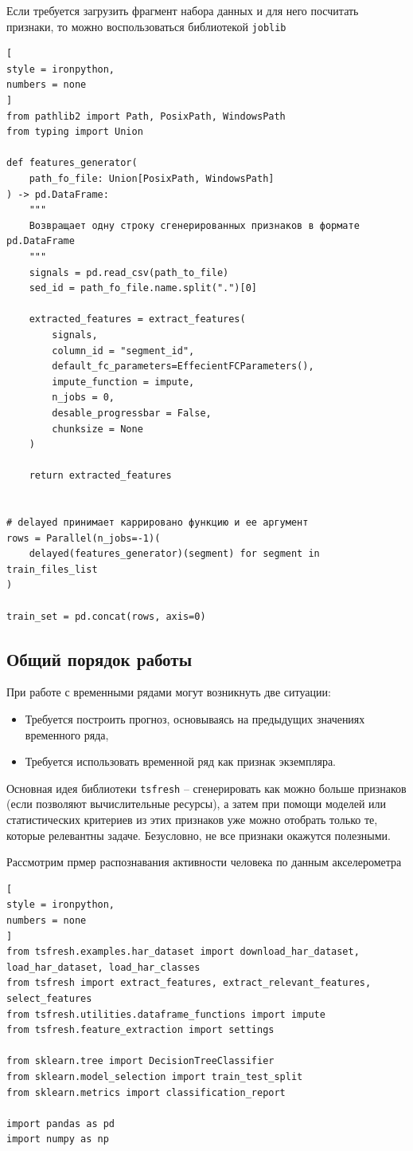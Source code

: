 \documentclass[%
	11pt,
	a4paper,
	utf8,
		]{article}
\begin{document}
Если требуется загрузить фрагмент набора данных и для него посчитать признаки, то можно воспользоваться библиотекой \texttt{joblib}
\begin{lstlisting}[
style = ironpython,
numbers = none	
]
from pathlib2 import Path, PosixPath, WindowsPath
from typing import Union

def features_generator(
    path_fo_file: Union[PosixPath, WindowsPath]
) -> pd.DataFrame:
    """
    Возвращает одну строку сгенерированных признаков в формате pd.DataFrame
    """
    signals = pd.read_csv(path_to_file)
    sed_id = path_fo_file.name.split(".")[0]
    
    extracted_features = extract_features(
        signals,
        column_id = "segment_id",
        default_fc_parameters=EffecientFCParameters(),
        impute_function = impute,
        n_jobs = 0,
        desable_progressbar = False,
        chunksize = None
    )
    
    return extracted_features
    

# delayed принимает каррировано функцию и ее аргумент
rows = Parallel(n_jobs=-1)(
    delayed(features_generator)(segment) for segment in train_files_list
)

train_set = pd.concat(rows, axis=0)
\end{lstlisting}



\subsection{Общий порядок работы}



При работе с временными рядами могут возникнуть две ситуации:
\begin{itemize}
	\item Требуется построить прогноз, основываясь на предыдущих значениях временного ряда,
	
	\item Требуется использовать временной ряд как признак экземпляра.
\end{itemize}

Основная идея библиотеки \texttt{tsfresh} -- сгенерировать как можно больше признаков (если позволяют вычислительные ресурсы), а затем при помощи моделей или статистических критериев из этих признаков уже можно отобрать только те, которые релевантны задаче. Безусловно, не все признаки окажутся полезными.

Рассмотрим прмер распознавания активности человека по данным акселерометра
\begin{lstlisting}[
style = ironpython,
numbers = none	
]
from tsfresh.examples.har_dataset import download_har_dataset, load_har_dataset, load_har_classes
from tsfresh import extract_features, extract_relevant_features, select_features
from tsfresh.utilities.dataframe_functions import impute
from tsfresh.feature_extraction import settings

from sklearn.tree import DecisionTreeClassifier
from sklearn.model_selection import train_test_split
from sklearn.metrics import classification_report

import pandas as pd
import numpy as np
\end{lstlisting}
\end{document}
